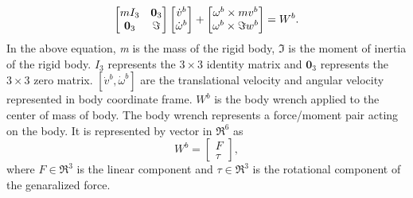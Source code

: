 \begin{equation}
\label{eq:dyn_rig_bdy}
\begin{bmatrix}
mI_3 & \textbf{0}_3 \\ \textbf{0}_3 &\Im
\end{bmatrix}
\begin{bmatrix}
\dot{v}^b\\ \dot{\omega}^b
\end{bmatrix}
+ \begin{bmatrix}
\omega^b \times mv^b \\ 
\omega^b \times \Im w^b
\end{bmatrix}
= W^b.\\
\end{equation}
In the above equation, \emph{m} is the mass of the rigid body, $\Im$ is the moment of inertia of the rigid body. $I_3$ represents the $3 \times 3$ identity matrix and $ \textbf{0}_3$ represents the  $3 \times 3$ zero matrix. $[\dot{v}^b,\dot{\omega}^b]$ are the translational velocity and angular velocity represented in body coordinate frame. $W^b$ is the body wrench applied to the center of mass of body. The body wrench represents a force/moment pair acting on the body. It is represented by vector in $\Re^6$ as \citep{mur94}
$$ W^b = \begin{bmatrix} F \\ \tau \end{bmatrix}, $$ where $F \in \Re^3$ is the linear component and $\tau \in \Re^3$ is the rotational component of the genaralized force.

